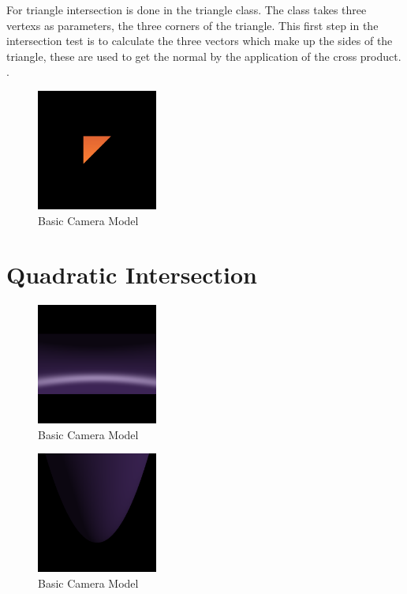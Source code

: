 \documentclass{article}
\begin{document}
For triangle intersection is done in the triangle class. The class takes three
vertexs as parameters, the three corners of the triangle. This first step in the
intersection test is to calculate the three vectors which make up the sides
of the triangle, these are used to get the normal by the application of the
cross product. \cite{triabgle}.

\begin{figure}[H]
  \begin{center}
  \includegraphics[width=150px]{Images/triangle.png}
  \caption{Basic Camera Model}
  \label{fig:basiccammod}
  \end{center}
\end{figure}

\section{Quadratic Intersection}

\begin{figure}[H]
  \begin{center}
  \includegraphics[width=150px]{Images/quadCylinder.png}
  \caption{Basic Camera Model}
  \label{fig:basiccammod}
  \end{center}
\end{figure}

\begin{figure}[H]
  \begin{center}
  \includegraphics[width=150px]{Images/quadParaboid.png}
  \caption{Basic Camera Model}
  \label{fig:basiccammod}
  \end{center}
\end{figure}
\end{document}
